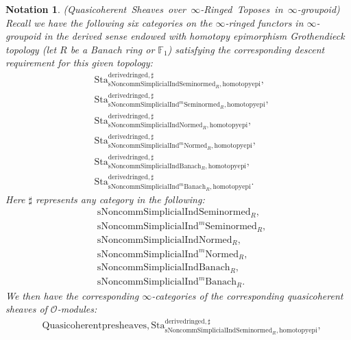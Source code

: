 \documentclass[12pt]{book}
\newtheorem{notation}{Notation}
\begin{document}
\begin{notation}\mbox{\rm{(Quasicoherent Sheaves over $\infty$-Ringed Toposes in $\infty$-groupoid)}}
Recall we have the following six categories on the $\infty$-ringed functors in $\infty$-groupoid in the derived sense endowed with homotopy epimorphism Grothendieck topology (let $R$ be a Banach ring or $\mathbb{F}_1$) satisfying the corresponding descent requirement for this given topology:
\begin{align}
&\mathrm{Sta}^\mathrm{derivedringed,\sharp}_{\mathrm{sNoncomm}\mathrm{Simplicial}\mathrm{Ind}\mathrm{Seminormed}_R,\mathrm{homotopyepi}},\\
&\mathrm{Sta}^\mathrm{derivedringed,\sharp}_{\mathrm{sNoncomm}\mathrm{Simplicial}\mathrm{Ind}^m\mathrm{Seminormed}_R,\mathrm{homotopyepi}},\\
&\mathrm{Sta}^\mathrm{derivedringed,\sharp}_{\mathrm{sNoncomm}\mathrm{Simplicial}\mathrm{Ind}\mathrm{Normed}_R,\mathrm{homotopyepi}},\\
&\mathrm{Sta}^\mathrm{derivedringed,\sharp}_{\mathrm{sNoncomm}\mathrm{Simplicial}\mathrm{Ind}^m\mathrm{Normed}_R,\mathrm{homotopyepi}},\\
&\mathrm{Sta}^\mathrm{derivedringed,\sharp}_{\mathrm{sNoncomm}\mathrm{Simplicial}\mathrm{Ind}\mathrm{Banach}_R,\mathrm{homotopyepi}},\\
&\mathrm{Sta}^\mathrm{derivedringed,\sharp}_{\mathrm{sNoncomm}\mathrm{Simplicial}\mathrm{Ind}^m\mathrm{Banach}_R,\mathrm{homotopyepi}}.	
\end{align}
Here $\sharp$ represents any category in the following:
\begin{align}
&\mathrm{sNoncomm}\mathrm{Simplicial}\mathrm{Ind}\mathrm{Seminormed}_R,\\
&\mathrm{sNoncomm}\mathrm{Simplicial}\mathrm{Ind}^m\mathrm{Seminormed}_R,\\
&\mathrm{sNoncomm}\mathrm{Simplicial}\mathrm{Ind}\mathrm{Normed}_R,\\
&\mathrm{sNoncomm}\mathrm{Simplicial}\mathrm{Ind}^m\mathrm{Normed}_R,\\
&\mathrm{sNoncomm}\mathrm{Simplicial}\mathrm{Ind}\mathrm{Banach}_R,\\
&\mathrm{sNoncomm}\mathrm{Simplicial}\mathrm{Ind}^m\mathrm{Banach}_R.	
\end{align}	
We then have the corresponding $\infty$-categories of the corresponding quasicoherent sheaves of $\mathcal{O}$-modules:
\begin{align}
&\mathrm{Quasicoherentpresheaves,Sta}^\mathrm{derivedringed,\sharp}_{\mathrm{sNoncomm}\mathrm{Simplicial}\mathrm{Ind}\mathrm{Seminormed}_R,\mathrm{homotopyepi}},\\

\end{align}
\end{notation}
\end{document}
